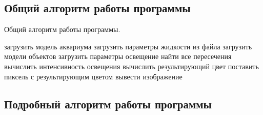 \documentclass[14pt,a4paper]{extarticle}
\begin{document}
	\subsection{Общий алгоритм работы программы} 
		
    	\begin{algorithm}[H]
    		\caption{Общий алгоритм работы программы.}
    		\begin{algorithmic}[1]
    			\BeginAlgorithm
    			\State	загрузить модель аквариума
    			\State	загрузить параметры жидкости из файла
    			\State	загрузить модели объектов
    			\State	загрузить параметры освещение
    				\State найти все пересечения
    				\State вычислить интенсивность освещения
    				\EndFor
    				\State вычислить результирующий цвет
    				\State поставить пиксель с результирующим цветом
	    		\EndFor	
	    		\State вывести изображение
	    		\EndAlgorithm	
    		\end{algorithmic}
    	\end{algorithm}
    
    \subsection{Подробный алгоритм работы программы}
\end{document}
